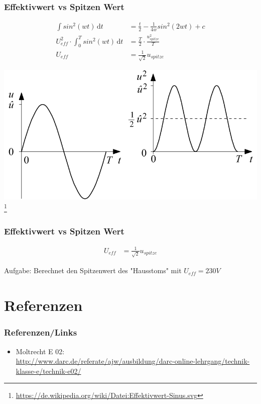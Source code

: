 \begin{frame}
    \frametitle{Effektivwert vs Spitzen Wert}
    \begin{align} 
		\int \! sin^2(w t) \, \mathrm{d}t & = \frac{t}{2} - \frac{1}{4w}sin^2(2wt) + c \\
		U_{eff}^2 \cdot \int_0^T \! sin^2(w t) \, \mathrm{d}t & = \frac{T}{2} \cdot \frac{u_{spitze}^2}{T} \\
		U_{eff} & = \frac{1}{\sqrt{2}} u_{spitze}
	\end{align}
	    \begin{center}
	    \includegraphics[width=.69\textwidth]{e02/EffektivwertSinus.png}\\
	    \footnote{\tiny \url{https://de.wikipedia.org/wiki/Datei:Effektivwert-Sinus.svg}}
	 	\end{center}
\end{frame}

\begin{frame}
    \frametitle{Effektivwert vs Spitzen Wert}
    \begin{align} 
		U_{eff} & = \frac{1}{\sqrt{2}} u_{spitze}
	\end{align}
	    \begin{center}
	    Aufgabe: Berechnet den Spitzenwert des "Hausstoms" mit $U_{eff} = 230V$
	 	\end{center}
\end{frame}

\section*{Referenzen}

\begin{frame}
    \frametitle{Referenzen/Links}
    
    \footnotesize
    \begin{itemize}
        \item Moltrecht E 02: \\
              \url{http://www.darc.de/referate/ajw/ausbildung/darc-online-lehrgang/technik-klasse-e/technik-e02/}
    \end{itemize}

\end{frame}


